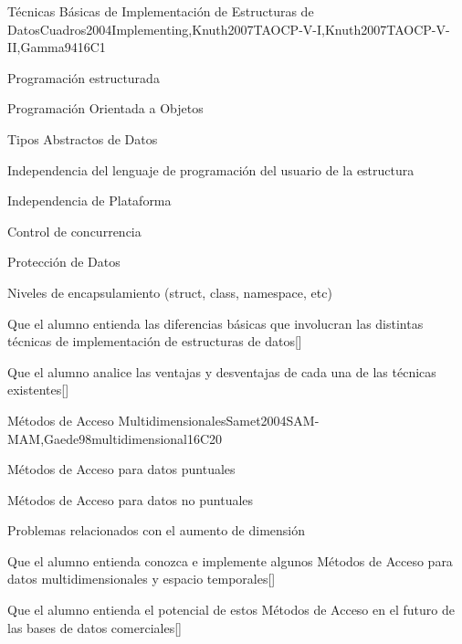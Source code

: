 \begin{syllabus}
\begin{unit}{Técnicas Básicas de Implementación de Estructuras de Datos}{}{Cuadros2004Implementing,Knuth2007TAOCP-V-I,Knuth2007TAOCP-V-II,Gamma94}{16}{C1}
   \begin{topics}
         \item Programación estructurada
         \item Programación Orientada a Objetos
         \item Tipos Abstractos de Datos
         \item Independencia del lenguaje de programación del usuario de la estructura
         \item Independencia de Plataforma
         \item Control de concurrencia
         \item Protección de Datos
         \item Niveles de encapsulamiento (struct, class, namespace, etc)
   \end{topics}
   \begin{learningoutcomes}
         \item Que el alumno entienda las diferencias básicas que involucran las distintas técnicas de implementación de estructuras de datos[\Usage]
         \item Que el alumno analice las ventajas y desventajas de cada una de las técnicas existentes[\Usage]
   \end{learningoutcomes}
\end{unit}

\begin{unit}{Métodos de Acceso Multidimensionales}{}{Samet2004SAM-MAM,Gaede98multidimensional}{16}{C20}
   \begin{topics}
         \item Métodos de Acceso para datos puntuales
         \item Métodos de Acceso para datos no puntuales
         \item Problemas relacionados con el aumento de dimensión
   \end{topics}
   \begin{learningoutcomes}
         \item Que el alumno entienda conozca e implemente algunos Métodos de Acceso para datos multidimensionales y espacio temporales[\Usage]
         \item Que el alumno entienda el potencial de estos Métodos de Acceso en el futuro de las bases de datos comerciales[\Usage]
   \end{learningoutcomes}
\end{unit}


\end{syllabus}
